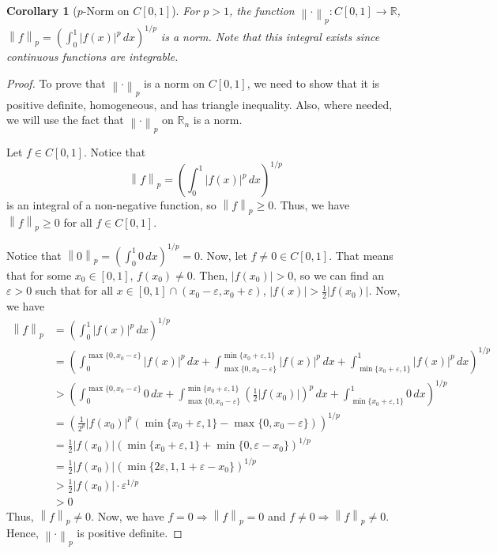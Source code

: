 \documentclass{article}
\renewcommand{\implies}{\Rightarrow}
\newcommand{\R}{\mathbb{R}}
\newcommand{\norm}[1]{\left\|#1\right\|}
\theoremstyle{plain} %
\numberwithin{thm}{section} %
\newtheorem{cor}[thm]{Corollary}
\theoremstyle{definition} %
\begin{document}
\begin{cor}[{$p$-Norm on $C[0, 1]$}]
     For $p > 1$, the function $\norm{\cdot}_p: C[0, 1] \to \R$,\\ $\norm{f}_p = \left(\int_0^1 |f(x)|^p\,dx\right)^{1/p}$ is a norm. Note that this integral exists since continuous functions are integrable.
\end{cor}

\begin{proof}
To prove that $\norm{\cdot}_p$ is a norm on $C[0, 1]$, we need to show that it is positive definite, homogeneous, and has triangle inequality. Also, where needed, we will use the fact that $\norm{\cdot}_p$ on $\R_n$ is a norm.

 Let $f \in C[0, 1]$. Notice that
\[
    \norm{f}_p = \left(\int_0^1 |f(x)|^p \,dx \right)^{1/p}
\]
is an integral of a non-negative function, so $\norm{f}_p \geq 0$. Thus, we have $\norm{f}_p \geq 0$ for all $f \in C[0, 1]$.

Notice that $\norm{0}_p = \left(\int_0^1 0 \,dx \right)^{1/p} = 0$. Now, let $f \neq 0 \in C[0, 1]$. That means that for some $x_0 \in [0, 1]$, $f(x_0) \neq 0$. Then, $|f(x_0)| > 0$, so we can find an $\varepsilon > 0$ such that for all $x \in [0, 1] \cap (x_0 - \varepsilon, x_0 + \varepsilon)$, $|f(x)| > \frac{1}{2}|f(x_0)|$. Now, we have
\begin{align*}
    \norm{f}_p
    &= \left(\int_0^1 |f(x)|^p \,dx \right)^{1/p} &\\
    &= \left(\int_0^{\max\{0, x_0 - \varepsilon\}} |f(x)|^p \,dx + \int_{\max\{0, x_0 - \varepsilon \}}^{\min\{x_0 + \varepsilon, 1\}} |f(x)|^p \,dx + \int_{\min\{x_0 + \varepsilon, 1\}}^1 |f(x)|^p \,dx \right)^{1/p} &\\
    &> \left(\int_0^{\max\{0, x_0 - \varepsilon\}} 0 \,dx + \int_{\max\{0, x_0 - \varepsilon \}}^{\min\{x_0 + \varepsilon, 1\}} \left(\frac{1}{2}|f(x_0)|\right)^p \,dx + \int_{\min\{x_0 + \varepsilon, 1\}}^1 0 \,dx \right)^{1/p} &\\
    &=\left(\frac{1}{2^p}|f(x_0)|^p\left(\min\{x_0 + \varepsilon, 1\} - \max\{0, x_0 - \varepsilon \}\right) \right)^{1/p} &\\
    &=\frac{1}{2}|f(x_0)|\left(\min\{x_0 + \varepsilon, 1\} + \min\{0, \varepsilon - x_0 \}\right)^{1/p} &\\
    &=\frac{1}{2}|f(x_0)|\left(\min\{2\varepsilon, 1, 1 + \varepsilon - x_0 \}\right)^{1/p} &\\
    &>\frac{1}{2}|f(x_0)|\cdot\varepsilon^{1/p} &\\
    &> 0
\end{align*}
Thus, $\norm{f}_p \neq 0$. Now, we have $f = 0 \implies \norm{f}_p = 0$ and $f \neq 0 \implies \norm{f}_p \neq 0$. Hence, $\norm{\cdot}_p$ is positive definite.


\end{proof}
\end{document}
